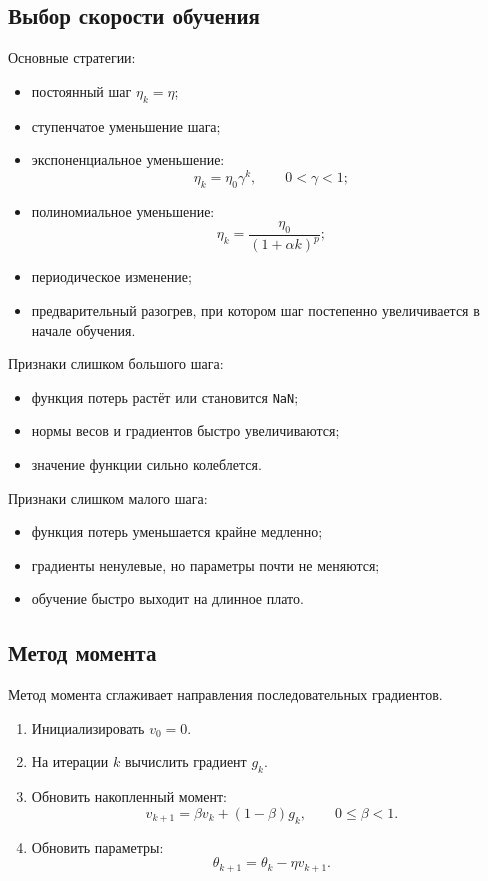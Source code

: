\documentclass[12pt,a4paper]{article}
\theoremstyle{plain}
\theoremstyle{definition}
\theoremstyle{remark}
\begin{document}
\subsection{Выбор скорости обучения}

Основные стратегии:

\begin{itemize}
    \item постоянный шаг $\eta_k=\eta$;
    \item ступенчатое уменьшение шага;
    \item экспоненциальное уменьшение:
    \[
        \eta_k=\eta_0\gamma^k,
        \qquad 0<\gamma<1;
    \]
    \item полиномиальное уменьшение:
    \[
        \eta_k
        =
        \frac{\eta_0}{(1+\alpha k)^p};
    \]
    \item периодическое изменение;
    \item предварительный разогрев, при котором шаг постепенно
    увеличивается в начале обучения.
\end{itemize}

Признаки слишком большого шага:

\begin{itemize}
    \item функция потерь растёт или становится \texttt{NaN};
    \item нормы весов и градиентов быстро увеличиваются;
    \item значение функции сильно колеблется.
\end{itemize}

Признаки слишком малого шага:

\begin{itemize}
    \item функция потерь уменьшается крайне медленно;
    \item градиенты ненулевые, но параметры почти не меняются;
    \item обучение быстро выходит на длинное плато.
\end{itemize}

\subsection{Метод момента}

Метод момента сглаживает направления последовательных градиентов.

\begin{enumerate}
    \item Инициализировать $v_0=0$.
    \item На итерации $k$ вычислить градиент $g_k$.
    \item Обновить накопленный момент:
    \[
        v_{k+1}
        =
        \beta v_k+(1-\beta)g_k,
        \qquad 0\leq\beta<1.
    \]
    \item Обновить параметры:
    \[
        \theta_{k+1}
        =
        \theta_k-\eta v_{k+1}.
    \]
\end{enumerate}
\end{document}
